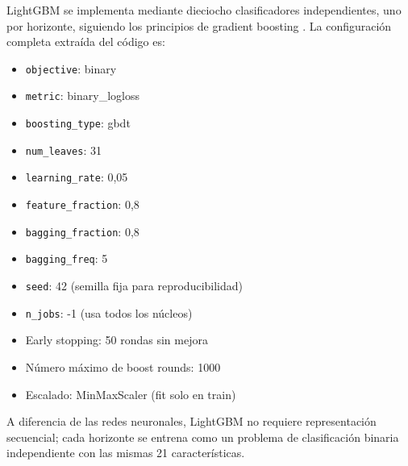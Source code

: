 LightGBM se implementa mediante dieciocho clasificadores independientes, uno por horizonte, siguiendo los principios de gradient boosting \cite{friedman2001greedy, ke2017lightgbm}. La configuración completa extraída del código es:

\begin{itemize}
    \item \texttt{objective}: binary
    \item \texttt{metric}: binary\_logloss
    \item \texttt{boosting\_type}: gbdt
    \item \texttt{num\_leaves}: 31
    \item \texttt{learning\_rate}: 0,05
    \item \texttt{feature\_fraction}: 0,8
    \item \texttt{bagging\_fraction}: 0,8
    \item \texttt{bagging\_freq}: 5
    \item \texttt{seed}: 42 (semilla fija para reproducibilidad)
    \item \texttt{n\_jobs}: -1 (usa todos los núcleos)
    \item Early stopping: 50 rondas sin mejora
    \item Número máximo de boost rounds: 1000
    \item Escalado: MinMaxScaler (fit solo en train)
\end{itemize}

A diferencia de las redes neuronales, LightGBM no requiere representación secuencial; cada horizonte se entrena como un problema de clasificación binaria independiente con las mismas 21 características.\\

